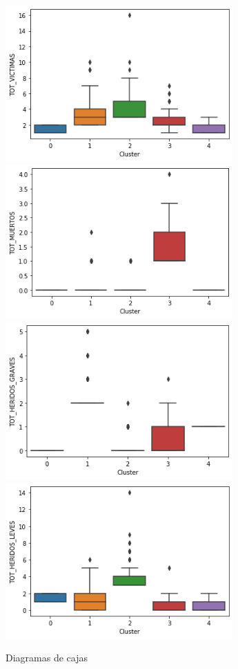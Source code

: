 \documentclass[a4]{article}
\begin{document}
\begin{figure}[H]
  \centering
  \caption{Diagramas de cajas}
  \includegraphics[width=87mm]{imagenes/c1_kmeans_bp_vic}
  \includegraphics[width=87mm]{imagenes/c1_kmeans_bp_muertos}
    \includegraphics[width=87mm]{imagenes/c1_kmeans_bp_hg}
  \includegraphics[width=87mm]{imagenes/c1_kmeans_bp_hl}

\end{figure}
\end{document}
